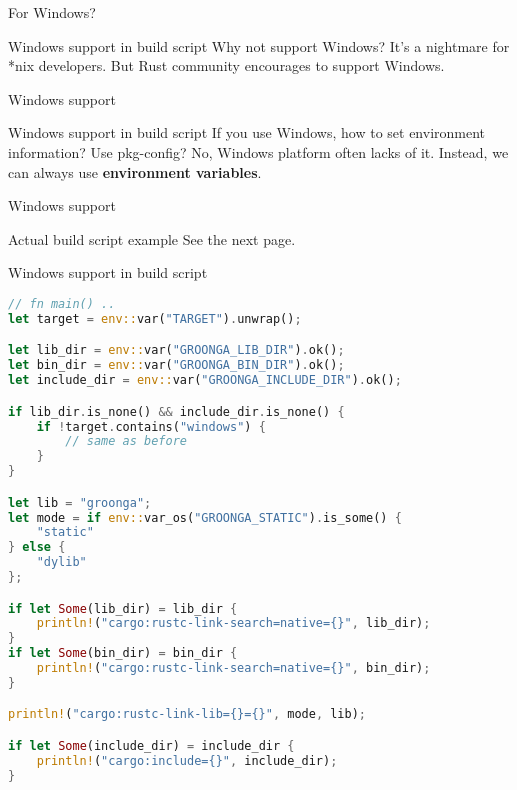 \documentclass[12pt, unicode]{beamer}
\begin{document}
\begin{frame}[fragile]{For Windows?}
  \begin{block}{Windows support in build script}
    Why not support Windows?
    \newline
    It's a nightmare for *nix developers.
    \newline
    But Rust community encourages to support Windows.
  \end{block}
\end{frame}

\begin{frame}{Windows support}
  \begin{block}{Windows support in build script}
    If you use Windows, how to set environment information?
    Use pkg-config? No, Windows platform often lacks of it.
    \newline
    Instead, we can always use \textbf {environment variables}.
  \end{block}
\end{frame}

\begin{frame}{Windows support}
  \begin{block}{Actual build script example}
    See the next page.
  \end{block}
\end{frame}

\begin{frame}[fragile]{Windows support in build script}
  \begin{lstlisting}[language={Rust},basicstyle=\ttfamily\XSmall]
// fn main() ..
let target = env::var("TARGET").unwrap();

let lib_dir = env::var("GROONGA_LIB_DIR").ok();
let bin_dir = env::var("GROONGA_BIN_DIR").ok();
let include_dir = env::var("GROONGA_INCLUDE_DIR").ok();

if lib_dir.is_none() && include_dir.is_none() {
    if !target.contains("windows") {
        // same as before
    }
}

let lib = "groonga";
let mode = if env::var_os("GROONGA_STATIC").is_some() {
    "static"
} else {
    "dylib"
};

if let Some(lib_dir) = lib_dir {
    println!("cargo:rustc-link-search=native={}", lib_dir);
}
if let Some(bin_dir) = bin_dir {
    println!("cargo:rustc-link-search=native={}", bin_dir);
}

println!("cargo:rustc-link-lib={}={}", mode, lib);

if let Some(include_dir) = include_dir {
    println!("cargo:include={}", include_dir);
}
  \end{lstlisting}

\end{frame}
\end{document}
